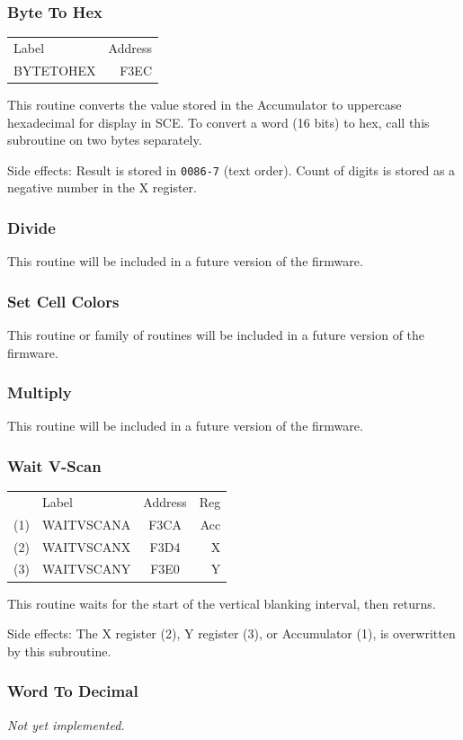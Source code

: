 \documentclass[12pt]{{memoir}}
\newcommand\fwsubroutinehdr[1]{%
\filbreak
\subsubsection{#1}}
\begin{document}
\fwsubroutinehdr{Byte To Hex}

\begin{center}\begin{tabular}{>{\ttfamily}l>{\ttfamily}r}
\textrm{Label} & \textrm{Address} \\
BYTETOHEX & F3EC \\
\end{tabular}\end{center}

This routine converts the value stored in the Accumulator to uppercase hexadecimal for display in SCE. To convert a word (16 bits) to hex, call this subroutine on two bytes separately.

Side effects: Result is stored in \texttt{0086-7} (text order). Count of digits is stored as a negative number in the X register.

\fwsubroutinehdr{Divide}

This routine will be included in a future version of the firmware.

\fwsubroutinehdr{Set Cell Colors}

This routine or family of routines will be included in a future version of the firmware.

\fwsubroutinehdr{Multiply}

This routine will be included in a future version of the firmware.

\fwsubroutinehdr{Wait V-Scan}

\begin{center}\begin{tabular}{r>{\ttfamily}l>{\ttfamily}cr}
& \textrm{Label} & \textrm{Address} & Reg \\
(1) & WAITVSCANA & F3CA & Acc \\
(2) & WAITVSCANX & F3D4 & X \\
(3) & WAITVSCANY & F3E0 & Y \\
\end{tabular}\end{center}

This routine waits for the start of the vertical blanking interval, then returns. 

Side effects: The X register (2), Y register (3), or Accumulator (1), is overwritten by this subroutine.

\fwsubroutinehdr{Word To Decimal}

\textit{Not yet implemented.}
\end{document}
